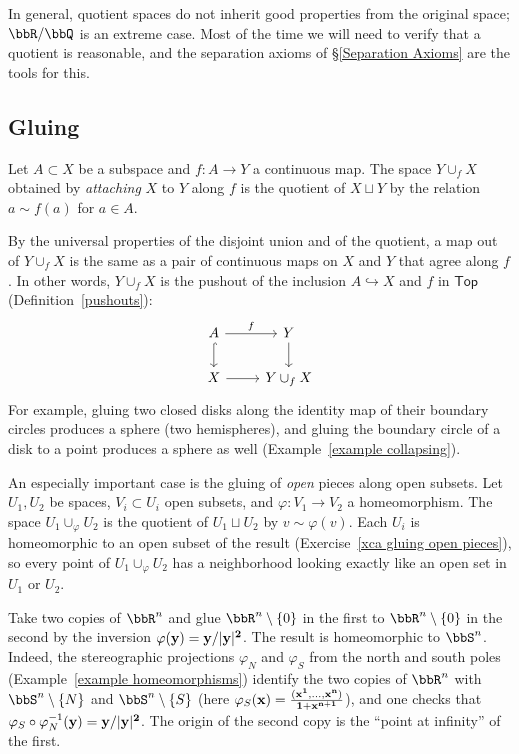 \begin{rem}
    In general, quotient spaces do not inherit good properties from the original space; $\bbR/\bbQ$ is an extreme case. Most of the time we will need to verify that a quotient is reasonable, and the separation axioms of \S\ref{Separation Axioms} are the tools for this.
\end{rem}

\subsection{Gluing}

\begin{defn}
    Let $A\subset X$ be a subspace and $f:A\to Y$ a continuous map. The space $Y\cup_fX$ obtained by \emph{attaching} $X$ to $Y$ along $f$ is the quotient of $X\sqcup Y$ by the relation $a\sim f(a)$ for $a\in A$.
\end{defn}

By the universal properties of the disjoint union and of the quotient, a map out of $Y\cup_fX$ is the same as a pair of continuous maps on $X$ and $Y$ that agree along $f$. In other words, $Y\cup_fX$ is the pushout of the inclusion $A\hookrightarrow X$ and $f$ in $\mathsf{Top}$ (Definition~\ref{pushouts}):
\[\begin{tikzcd}
    A\arrow[r,"f"]\arrow[d,hook] & Y\arrow[d]\\
    X\arrow[r] & Y\cup_fX
\end{tikzcd}\]
For example, gluing two closed disks along the identity map of their boundary circles produces a sphere (two hemispheres), and gluing the boundary circle of a disk to a point produces a sphere as well (Example~\ref{example collapsing}).

An especially important case is the gluing of \emph{open} pieces along open subsets. Let $U_1,U_2$ be spaces, $V_i\subset U_i$ open subsets, and $\varphi:V_1\to V_2$ a homeomorphism. The space $U_1\cup_\varphi U_2$ is the quotient of $U_1\sqcup U_2$ by $v\sim\varphi(v)$. Each $U_i$ is homeomorphic to an open subset of the result (Exercise~\ref{xca gluing open pieces}), so every point of $U_1\cup_\varphi U_2$ has a neighborhood looking exactly like an open set in $U_1$ or $U_2$.

\begin{example}\label{example sphere two charts}
    Take two copies of $\bbR^n$ and glue $\bbR^n\setminus\{0\}$ in the first to $\bbR^n\setminus\{0\}$ in the second by the inversion $\varphi(\bf{y})=\bf{y}/\lvert \bf{y}\rvert^2$. The result is homeomorphic to $\bbS^n$. Indeed, the stereographic projections $\varphi_N$ and $\varphi_S$ from the north and south poles (Example~\ref{example homeomorphisms}) identify the two copies of $\bbR^n$ with $\bbS^n\setminus\{N\}$ and $\bbS^n\setminus\{S\}$ (here $\varphi_S(\bf{x})=\frac{(x^1,\ldots,x^n)}{1+x^{n+1}}$), and one checks that $\varphi_S\circ\varphi_N^{-1}(\bf{y})=\bf{y}/\lvert \bf{y}\rvert^2$. The origin of the second copy is the ``point at infinity'' of the first.
\end{example}

